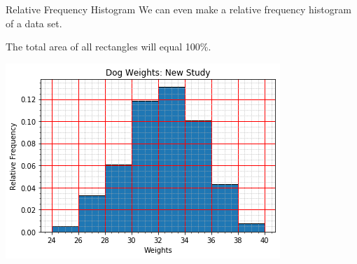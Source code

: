 \documentclass[t]{beamer}
\begin{document}
\begin{frame}{Relative Frequency Histogram}
We can even make a relative frequency histogram of a data set.	\newline\\	\pause

The total area of all rectangles will equal 100\%.	\newline\\	\pause
\begin{center}
\includegraphics[scale=0.55]{../Images/dog_weights_relfreq_hist.png}
\end{center}
\end{frame}
\end{document}
